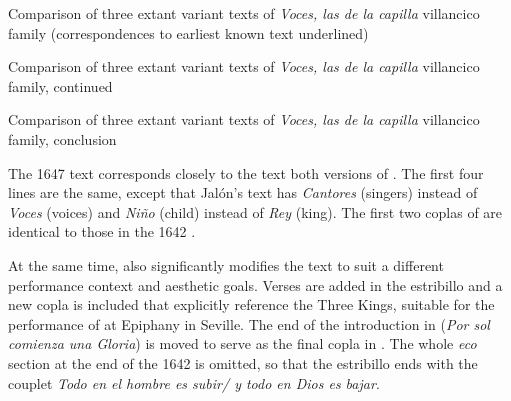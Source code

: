 {Comparison of three extant variant texts of \emph{Voces, las de la capilla}
villancico family (correspondences to earliest known text underlined)}

{Comparison of three extant variant texts of \emph{Voces, las de la capilla}
villancico family, continued}

{Comparison of three extant variant texts of \emph{Voces, las de la capilla}
villancico family, conclusion}

The 1647  text corresponds closely to the text both versions of
.
The first four lines are the same, except that Jalón's text has \emph{Cantores}
(singers) instead of \emph{Voces} (voices) and \emph{Niño} (child) instead of
\emph{Rey} (king).
The first two coplas of  are identical to those in the 1642
.

At the same time,  also significantly modifies the text to suit
a different performance context and aesthetic goals.
Verses are added in the estribillo and a new copla is included that explicitly
reference the Three Kings, suitable for the performance of  at
Epiphany in Seville.
The end of the introduction in  (\emph{Por sol comienza una
Gloria}) is moved to serve as the final copla in .
The whole \emph{eco} section at the end of the 1642  is omitted,
so that the estribillo ends with the couplet \emph{Todo en el hombre es subir/ y
todo en Dios es bajar}.

